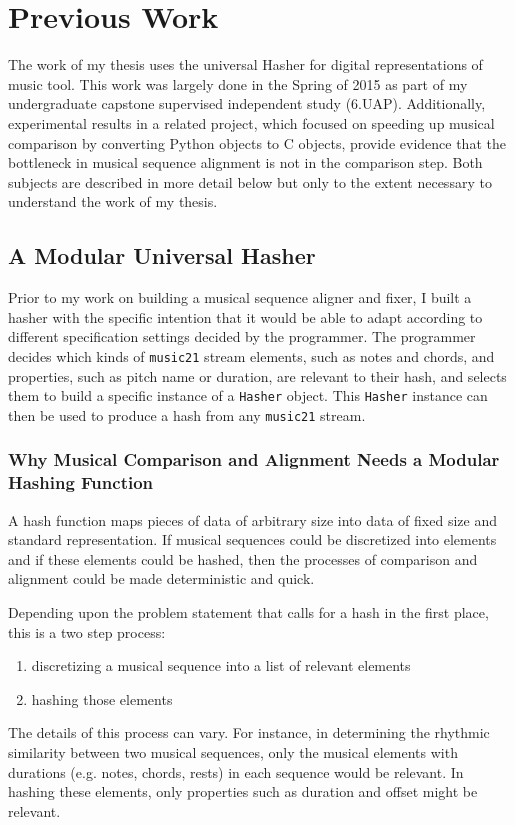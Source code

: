 \chapter{Previous Work}

The work of my thesis uses the universal Hasher for digital representations of music tool. This work was largely done in the Spring of 2015 as part of my undergraduate capstone supervised independent study (6.UAP). Additionally, experimental results in a related project, which focused on speeding up musical comparison by converting Python objects to C objects, provide evidence that the bottleneck in musical sequence alignment is not in the comparison step. Both subjects are described in more detail below but only to the extent necessary to understand the work of my thesis.

\section{A Modular Universal Hasher} \label{hasher}
Prior to my work on building a musical sequence aligner and fixer, I built a hasher with the specific intention that it would be able  to adapt according to different specification settings decided by the programmer. The programmer decides which kinds of \texttt{music21} stream elements, such as notes and chords, and properties, such as pitch name or duration, are relevant to their hash, and selects them to build a specific instance of a \texttt{Hasher} object. This \texttt{Hasher} instance can then be used to produce a hash from any \texttt{music21} stream. 

\subsection{Why Musical Comparison and Alignment Needs a Modular Hashing Function}
A hash function maps pieces of data of arbitrary size into data of fixed size and standard representation. If musical sequences could be discretized into elements and if these elements could be hashed, then the processes of comparison and alignment could be made deterministic and quick. 

Depending upon the problem statement that calls for a hash in the first place, this is a two step process:
\begin{enumerate}
\item discretizing a musical sequence into a list of relevant elements
\item hashing those elements  
\end{enumerate}
The details of this process can vary.  For instance, in determining the rhythmic similarity between two musical sequences, only the musical elements with durations (e.g. notes, chords, rests) in each sequence would be relevant. In hashing these elements, only properties such as duration and offset might be relevant. 


